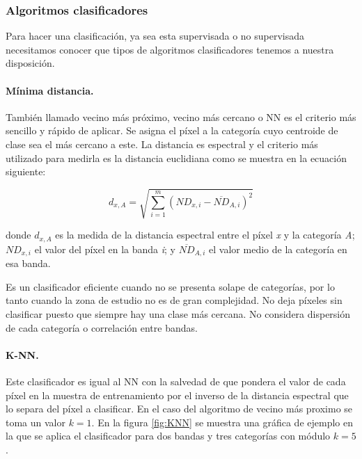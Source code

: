 \subsubsection{Algoritmos clasificadores}
Para hacer una clasificación, ya sea esta supervisada o no supervisada necesitamos conocer que tipos de algoritmos clasificadores tenemos a nuestra disposición.

\paragraph{Mínima distancia.}
También llamado vecino más próximo, vecino más cercano o \ac{NN} es el criterio más sencillo y rápido de aplicar. Se asigna el píxel a la categoría cuyo centroide de clase sea el más cercano a este.  La distancia es espectral y el criterio más utilizado para medirla es la distancia euclidiana como se muestra en la ecuación siguiente:

\begin{equation}
d_{x,A}=\sqrt{\displaystyle\sum_{i=1}^{m}(ND_{x,i}-\overline{ND}_{A,i})^{2}}
\end{equation}%

\noindent donde $d_{x,A}$ es la medida de la distancia espectral entre el píxel \textit{x} y la categoría \textit{A}; $ND_{x,i}$ el valor del píxel en la banda \textit{i}; y $\overline{ND}_{A,i}$ el valor medio de la categoría en esa banda.%

Es un clasificador eficiente cuando no se presenta solape de categorías, por lo tanto cuando la zona de estudio no es de gran complejidad. No deja píxeles sin clasificar puesto que siempre hay una clase más cercana. No considera dispersión de cada categoría o correlación entre bandas.

\paragraph{\ac{K-NN}.}
Este clasificador es igual al \ac{NN} con la salvedad de que pondera el valor de cada píxel en la muestra de entrenamiento por el inverso de la distancia espectral que lo separa del píxel a clasificar. En el caso del algoritmo de vecino más proximo se toma un valor $k=1$. En la figura \ref{fig:KNN} se muestra una gráfica de ejemplo en la que se aplica el clasificador para dos bandas y tres categorías con módulo $k=5$.

